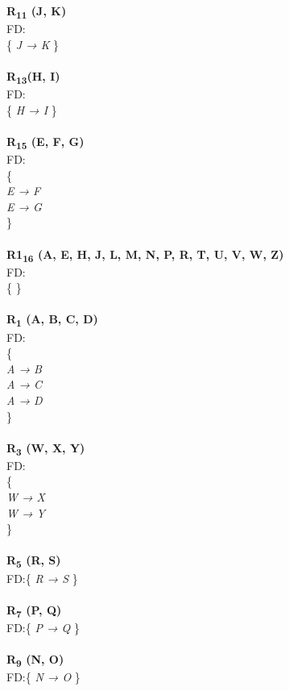 \begin{multicols}{2}
\begin{adjustwidth}{2cm}{}

\textbf{R\textsubscript{11} (J, K)}\\
FD:\\
\{\textit{ J → K }\} \\ \\

\noindent
\textbf{R\textsubscript{13}(H, I)}\\
FD:\\
\{ \textit{H → I} \} \\ \\

\noindent
\textbf{R\textsubscript{15} (E, F, G) }\\
FD:\\
\{\\
\textit{ 
E → F\\
E → G\\
}
\} \\ \\
	   
\noindent	   
\textbf{R1\textsubscript{16} (A, E, H, J, L, M, N, P, R, T, U, V, W, Z)}\\
FD:\\ \{ \}\\ \\

\noindent
\textbf{R\textsubscript{1} (A, B, C, D)}\\
FD:\\
\{\\
\textit{ 
A → B\\
A → C\\
A → D\\
}
\} \\ \\

\noindent
\textbf{R\textsubscript{3} (W, X, Y)}\\
FD:\\
\{\\
\textit{ 
W → X\\
W → Y\\ 
}
\} \\ \\

\noindent
\textbf{R\textsubscript{5} (R, S)}\\
FD:\{
\textit{ 
R → S 
}
\} \\ \\

\noindent
\textbf{R\textsubscript{7} (P, Q)}\\
FD:\{
\textit{ 
P → Q 
}
\} \\ \\

\noindent
\textbf{R\textsubscript{9} (N, O)}\\
FD:\{
\textit{ 
N → O 
}
\} \\ \\

\end{adjustwidth}
\end{multicols}

